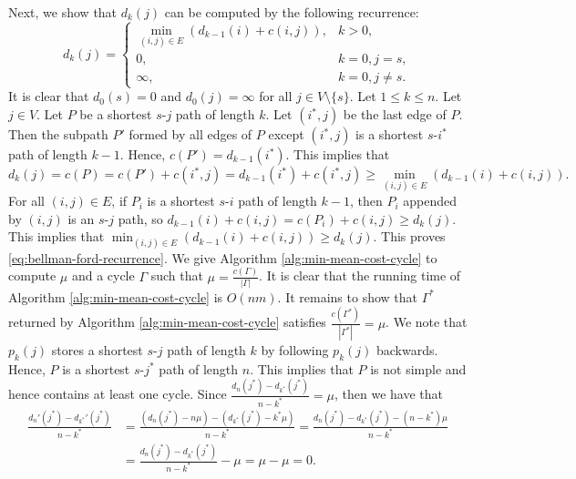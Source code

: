 \documentclass[letterpaper,reqno,12pt]{article}
\begin{document}
\begin{exercise}
  Next, we show that $d_k(j)$ can be computed by the following recurrence:
  \begin{equation} \label{eq:bellman-ford-recurrence}
    d_k(j) = \left\{
    \begin{array}{ll}
      \min_{(i, j) \in E} \left(d_{k - 1}(i) + c(i, j)\right), & k > 0, \\
      0, & k = 0, j = s, \\
      \infty, & k = 0, j \neq s.
    \end{array}
  \right.
  \end{equation}
  It is clear that $d_0(s) = 0$ and $d_0(j) = \infty$ for all $j \in V \setminus \{ s \}$. Let $1 \leq k \leq n$. Let $j \in V$. Let $P$ be a shortest $s$-$j$ path of length $k$. Let $(i^*, j)$ be the last edge of $P$. Then the subpath $P'$ formed by all edges of $P$ except $(i^*, j)$ is a shortest $s$-$i^*$ path of length $k - 1$. Hence, $c(P') = d_{k - 1}(i^*)$. This implies that
  $$ d_k(j) = c(P) = c(P') + c(i^*, j) = d_{k - 1}(i^*) + c(i^*, j) \geq \min_{(i, j) \in E} \left(d_{k - 1}(i) + c(i, j)\right). $$
  For all $(i, j) \in E$, if $P_i$ is a shortest $s$-$i$ path of length $k - 1$, then $P_i$ appended by $(i, j)$ is an $s$-$j$ path, so $d_{k - 1}(i) + c(i, j) = c(P_i) + c(i, j) \geq d_k(j)$. This implies that $\min_{(i, j) \in E} (d_{k - 1}(i) + c(i, j)) \geq d_k(j)$. This proves \eqref{eq:bellman-ford-recurrence}. We give Algorithm \ref{alg:min-mean-cost-cycle} to compute $\mu$ and a cycle $\Gamma$ such that $\mu = \frac{c(\Gamma)}{|\Gamma|}$. It is clear that the running time of Algorithm \ref{alg:min-mean-cost-cycle} is $O(nm)$. It remains to show that $\Gamma^*$ returned by Algorithm \ref{alg:min-mean-cost-cycle} satisfies $\frac{c(\Gamma^*)}{|\Gamma^*|} = \mu$. We note that $p_k(j)$ stores a shortest $s$-$j$ path of length $k$ by following $p_k(j)$ backwards. Hence, $P$ is a shortest $s$-$j^*$ path of length $n$. This implies that $P$ is not simple and hence contains at least one cycle. Since $\frac{d_n(j^*) - d_{k^*}(j^*)}{n - k^*} = \mu$, then we have that
  \begin{align*}
    \frac{d_n'\left(j^*\right) - d_{k^*}'\left(j^*\right)}{n - k^*} &= \frac{\left(d_n\left(j^*\right) - n\mu\right)- \left(d_{k^*}\left(j^*\right) - k^* \mu\right)}{n - k^*} = \frac{d_n\left(j^*\right) - d_{k^*}\left(j^*\right) - \left(n - k^*\right) \mu}{n - k^*} \\
    &= \frac{d_n\left(j^*\right) - d_{k^*}\left(j^*\right)}{n - k^*} - \mu = \mu - \mu = 0.
  \end{align*}

\end{exercise}
\end{document}
